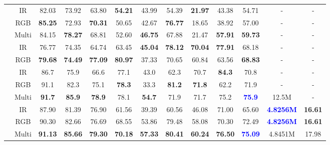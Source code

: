 \begin{table*}[htpb]
{\begin{tabular}{c|c|c|c|c|c|c|c|c|c|c|c|c}
		\midrule
		\textbf{\multirow{3}{*}{YOLOrs \cite{9273212}} }& IR         & 82.03          & 73.92         & 63.80          & \textbf{54.21 }        & 43.99          & 54.39          & \textbf{21.97 }         & 43.38          & 54.71     &- &-     \\
		& RGB        & \textbf{85.25}          & 72.93          & \textbf{70.31}          & 50.65         & 42.67          & \textbf{76.77}          & 18.65 & 38.92 & 57.00        &- &-  \\
		& Multi & 84.15 & \textbf{78.27} & 68.81 & 52.60 & \textbf{46.75} & 67.88 & 21.47         & \textbf{57.91}         & \textbf{59.73} & - &-\\
		\midrule
		\textbf{\multirow{2}{*}{YOLO-Fine \cite{pham2020yolo}} }& IR       & 76.77          & 74.35         & 64.74         & 63.45          & \textbf{45.04}          & \textbf{78.12}          & \textbf{70.04} & \textbf{77.91} & 68.18        &- &-   \\
		& RGB         & \textbf{79.68}         & \textbf{74.49}        & \textbf{77.09}          & \textbf{80.97}          & 37.33          & 70.65          & 60.84          & 63.56         & \textbf{68.83}     &- &-     \\
		\midrule
		\textbf{\multirow{3}{*}{YOLOFusion* \cite{qingyun2022cross}} } & IR        & 86.7          & 75.9          &66.6         & 77.1         & 43.0          & 62.3          & 70.7 & \textbf{84.3} & 70.8       &- &-  \\
		& RGB       & 91.1          & 82.3         & 75.1          & \textbf{78.3}        & 33.3          & \textbf{81.2}          & \textbf{71.8}         & 62.2          &  71.9    &- &-     \\
		& Multi & \textbf{91.7} & \textbf{85.9} & \textbf{78.9} & 78.1 & \textbf{54.7}& 71.9 & 71.7         &  75.2    & \textbf{\textcolor{blue}{75.9}}  & 12.5M &-\\
		\midrule
\textbf{\multirow{3}{*}{SuperYOLO}} & IR         & 87.90          & 81.39          & 76.90          & 61.56          & 39.39          & 60.56          & 46.08          & 71.00 & 65.60          & \textbf{\textcolor{blue}{4.8256M}}  & \textbf{16.61}\\
		& RGB        & 90.30          & 82.66 & 76.69          & 68.55          & 53.86          & 79.48 & 58.08          & 70.30          & 72.49         & \textbf{\textcolor{blue}{4.8256M}}  & \textbf{16.61}\\
& Multi & \textbf{91.13} & \textbf{85.66}        & \textbf{79.30} & \textbf{70.18} & \textbf{57.33} & \textbf{80.41}        & \textbf{60.24} & \textbf{76.50}          & \textbf{\textcolor{blue}{75.09}} & 4.8451M  & 17.98 \\
		\bottomrule[1.2pt]
	\end{tabular}}
\vspace{-0.1in}
\end{table*}
 








